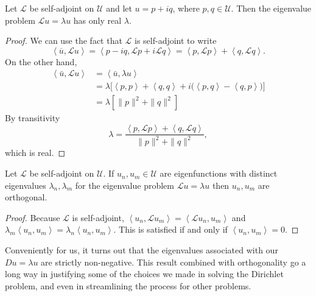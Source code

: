 \documentclass[../m180main.tex]{subfiles}
\begin{document}
\begin{theorem}[]
    Let $\mathcal L$ be self-adjoint on $\mathcal U$ and let $u = p + iq$, where $p,q \in \mathcal U$.
    Then the eigenvalue problem $\mathcal L u = \lambda u$ has only real $\lambda$.
\end{theorem}

\begin{proof}
    We can use the fact that $\mathcal L$ is self-adjoint to write
    \[ \left< \overline u, \mathcal{L} u \right> = \left< p - iq, \mathcal{L} p + i \mathcal{L} q \right> = \left< p, \mathcal{L} p \right> + \left< q, \mathcal{L} q \right>. \]
    On the other hand,
    \begin{align*}
        \left< \bar u, \mathcal{L} u \right> &= \left< \bar u, \lambda u \right> \\
        &= \lambda \big[ \left< p,p \right> + \left< q,q \right> + i \big( \left< p,q \right> - \left< q,p \right> \big) \big] \\
        &= \lambda \left[ \| p \|^2 + \| q \|^2 \right]
    \end{align*}
    By transitivity
    \[ \lambda = \frac{\left< p, \mathcal{L} p \right> + \left< q, \mathcal{L} q \right>}{\| p \|^2 + \| q \|^2}, \]
    which is real.
\end{proof}

\begin{theorem}[]
    Let $\mathcal L$ be self-adjoint on $\mathcal U$.
    If $u_n, u_m \in \mathcal U$ are eigenfunctions with distinct eigenvalues $\lambda_n, \lambda_m$ for the eigenvalue problem $\mathcal L u = \lambda u$ then $u_n, u_m$ are orthogonal.
\end{theorem}

\begin{proof}
    Because $\mathcal{L}$ is self-adjoint, $\left< u_n, \mathcal L u_m \right> = \left< \mathcal L u_n, u_m \right>$ and $\lambda_m \left< u_n, u_m \right> = \lambda_n \left< u_n, u_m \right>$.
    This is satisfied if and only if $\left< u_n, u_m \right> = 0$.
\end{proof}

Conveniently for us, it turns out that the eigenvalues associated with our $D u = \lambda u$ are strictly non-negative.
This result combined with orthogonality go a long way in justifying some of the choices we made in solving the Dirichlet problem, and even in streamlining the process for other problems.
\end{document}
